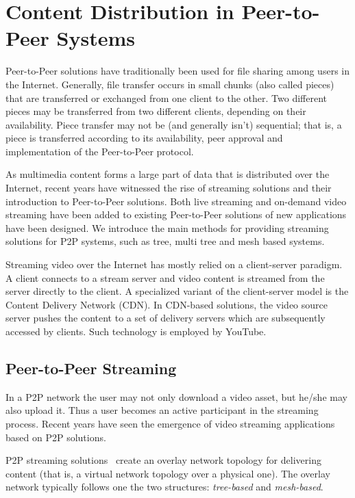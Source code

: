 
\section{Content Distribution in Peer-to-Peer Systems}
\label{sec:p2p-systems:streaming}

Peer-to-Peer solutions have traditionally been used for file sharing among
users in the Internet. Generally, file transfer occurs in small chunks (also
called pieces) that are transferred or exchanged from one client to the other.
Two different pieces may be transferred from two different clients, depending
on their availability. Piece transfer may not be (and generally isn't)
sequential; that is, a piece is transferred according to its availability,
peer approval and implementation of the Peer-to-Peer protocol.

As multimedia content forms a large part of data that is distributed over the
Internet, recent years have witnessed the rise of streaming solutions and
their introduction to Peer-to-Peer solutions. Both live streaming and
on-demand video streaming have been added to existing Peer-to-Peer solutions
of new applications have been designed. We introduce the main methods for
providing streaming solutions for P2P systems, such as tree, multi tree and
mesh based systems.

Streaming video over the Internet has mostly relied on a client-server
paradigm. A client connects to a stream server and video content is streamed
from the server directly to the client. A specialized variant of the
client-server model is the Content Delivery Network (CDN). In CDN-based
solutions, the video source server pushes the content to a set of delivery
servers which are subsequently accessed by clients. Such technology is
employed by YouTube.

\subsection{Peer-to-Peer Streaming}
\label{subsec:p2p-systems:p2p-streaming-p2p}

In a P2P network the user may not only download a video asset, but he/she may
also upload it. Thus a user becomes an active participant in the streaming
process. Recent years have seen the emergence of video streaming applications
based on P2P solutions.

P2P streaming solutions~\cite{p2p-streaming-survey} create an overlay network
topology for delivering content (that is, a virtual network topology over a
physical one).  The overlay network typically follows one the two structures:
\textit{tree-based} and \textit{mesh-based}.

